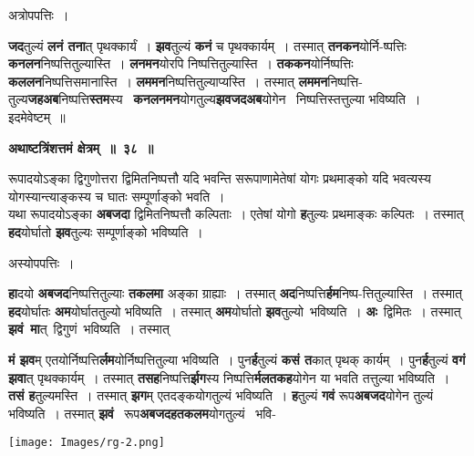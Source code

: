 \documentclass[11pt, openany]{book}
\begin{document}
\begin{center}
अत्रोपपत्तिः~। 
\end{center}

 \textbf{जद}तुल्यं \textbf{लनं तना}त् पृथक्कार्यं~। \textbf{झव}तुल्यं \textbf{कनं} च पृथक्कार्यम्~।  तस्मात् \textbf{तनकन}योर्नि-ष्पत्तिः \textbf{कनलन}निष्पत्तितुल्यास्ति~। \textbf{लनमन}योरपि निष्पत्तितुल्यास्ति~। \textbf{तककन}योर्निष्पत्तिः \textbf{कललन}निष्पत्तिसमानास्ति~। \textbf{लममन}निष्पत्तितुल्याप्यस्ति~। तस्मात् \textbf{लममन}निष्पत्ति-तुल्य\textbf{जहअब}निष्पत्ति\textbf{स्तम}स्य ~\textbf{कनलनमन}योगतुल्य\textbf{झवजदअब}योगेन ~निष्पत्तिस्तत्तुल्या भविष्यति~। इदमेवेष्टम्~॥ 

\newpage
\begin{center}
\textbf{\large अथाष्टत्रिंशत्तमं क्षेत्रम्~॥~३८~॥}
\end{center}

{\ab  रूपादयोऽङ्का द्विगुणोत्तरा द्विमितनिष्पत्तौ यदि भवन्ति सरूपाणामेतेषां योगः प्रथमाङ्को यदि भवत्यस्य योगस्यान्त्याङ्कस्य च घातः सम्पूर्णाङ्को भवति~। }\\

 यथा रूपादयोऽङ्का \textbf{अबजदा} द्विमितनिष्पत्तौ कल्पिताः~। एतेषां योगो \textbf{ह}तुल्यः प्रथमाङ्कः कल्पितः~। तस्मात् \textbf{हद}योर्घातो \textbf{झव}तुल्यः सम्पूर्णाङ्को भविष्यति~। 
 
\begin{center}
अस्योपपत्तिः~।
\end{center}

\textbf{हा}दयो \textbf{अबजद}निष्पत्तितुल्याः \textbf{तकलमा} अङ्का ग्राह्याः~। तस्मात् \textbf{अद}निष्पत्ति\textbf{र्हम}निष्प-त्तितुल्यास्ति~। तस्मात् \textbf{हद}योर्घातः \textbf{अम}योर्घाततुल्यो भविष्यति~। तस्मात् \textbf{अम}योर्घातो \textbf{झव}तुल्यो \,भविष्यति~। \textbf{अः} \,द्विमितः~। तस्मात् \,\textbf{झवं \,मा}त् \,द्विगुणं \,भविष्यति~। तस्मात्
\vspace{-4mm}

\begin{flushleft}
\begin{minipage}[b]{0.5\textwidth}
 \textbf{मं झव}म् एतयोर्निष्पत्ति\textbf{र्लम}योर्निष्पत्तितुल्या भविष्यति~। पुन\textbf{र्ह}तुल्यं \textbf{कसं त}कात् पृथक् कार्यम्~। पुन\textbf{र्ह}तुल्यं \textbf{वगं झवा}त् पृथक्कार्यम्~। तस्मात् \textbf{तसह}निष्पत्ति\textbf{र्झग}स्य निष्पत्ति\textbf{र्मलतकह}योगेन या भवति तत्तुल्या भविष्यति~। \textbf{तसं ह}तुल्यमस्ति~। तस्मात् \textbf{झग}म् एतदङ्कयोगतुल्यं भविष्यति~।  \textbf{ह}तुल्यं \textbf{गवं} रूप\textbf{अबजद}योगेन तुल्यं भविष्यति~। तस्मात् \textbf{झवं} ~रूप\textbf{अबजदहतकलम}योगतुल्यं ~भवि-
\end{minipage} 
\hfill
\begin{minipage}[b]{0.45\textwidth}
\centering
\texttt{[image: Images/rg-2.png]}
\end{minipage}
\end{flushleft}
\vspace{-4mm}
\end{document}
